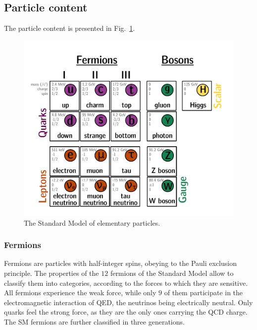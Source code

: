 \subsection{Particle content}

The particle content is presented in Fig.~\ref{fig:SM_chart}.
\begin{figure}[h!]
  \centering
  \includegraphics[width=1\textwidth]{neutrinophysics/fig_neutrinophysics/SM_chart.pdf}
  \caption{The Standard Model of elementary particles.
    \label{fig:SM_chart}}
\end{figure}

\subsubsection*{Fermions}

Fermions are particles with half-integer spins, obeying to the Pauli exclusion principle.
The properties of the $12$ fermions of the Standard Model allow to classify them into categories, according to the forces to which they are sensitive.
All fermions experience the weak force, while only $9$ of them participate in the electromagnetic interaction of QED, the neutrinos being electrically neutral.
Only quarks feel the strong force, as they are the only ones carrying the QCD charge.
The SM fermions are further classified in three generations.

